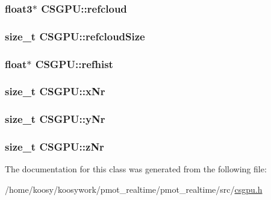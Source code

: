 \hypertarget{class_c_s_g_p_u_a6342a509f62d97d425b4759804872107}{
\subsubsection[{refcloud}]{\setlength{\rightskip}{0pt plus 5cm}float3$\ast$ {\bf \-C\-S\-G\-P\-U\-::refcloud}}}\label{class_c_s_g_p_u_a6342a509f62d97d425b4759804872107}
\hypertarget{class_c_s_g_p_u_aca9cc9e5ae863e7395d053ad724184da}{
\subsubsection[{refcloud\-Size}]{\setlength{\rightskip}{0pt plus 5cm}size\-\_\-t {\bf \-C\-S\-G\-P\-U\-::refcloud\-Size}}}\label{class_c_s_g_p_u_aca9cc9e5ae863e7395d053ad724184da}
\hypertarget{class_c_s_g_p_u_a8f0488218cd59487bb4900c066e5e250}{
\subsubsection[{refhist}]{\setlength{\rightskip}{0pt plus 5cm}float$\ast$ {\bf \-C\-S\-G\-P\-U\-::refhist}}}\label{class_c_s_g_p_u_a8f0488218cd59487bb4900c066e5e250}
\hypertarget{class_c_s_g_p_u_a8f232965ca3bfd56b6d96ea5b9d92a57}{
\subsubsection[{x\-Nr}]{\setlength{\rightskip}{0pt plus 5cm}size\-\_\-t {\bf \-C\-S\-G\-P\-U\-::x\-Nr}}}\label{class_c_s_g_p_u_a8f232965ca3bfd56b6d96ea5b9d92a57}
\hypertarget{class_c_s_g_p_u_a432972a16b011b3f0733b0e88185d8c9}{
\subsubsection[{y\-Nr}]{\setlength{\rightskip}{0pt plus 5cm}size\-\_\-t {\bf \-C\-S\-G\-P\-U\-::y\-Nr}}}\label{class_c_s_g_p_u_a432972a16b011b3f0733b0e88185d8c9}
\hypertarget{class_c_s_g_p_u_a628e566c47edc244f4ced4ea8fdff40c}{
\subsubsection[{z\-Nr}]{\setlength{\rightskip}{0pt plus 5cm}size\-\_\-t {\bf \-C\-S\-G\-P\-U\-::z\-Nr}}}\label{class_c_s_g_p_u_a628e566c47edc244f4ced4ea8fdff40c}


\-The documentation for this class was generated from the following file\-:\begin{DoxyCompactItemize}
\item 
/home/koosy/koosywork/pmot\-\_\-realtime/pmot\-\_\-realtime/src/\hyperlink{csgpu_8h}{csgpu.\-h}\end{DoxyCompactItemize}

